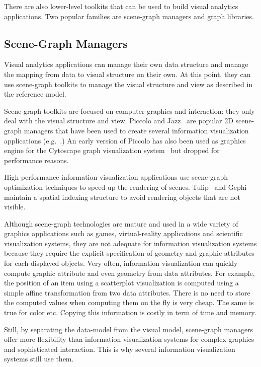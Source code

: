 There are also lower-level toolkits that can be used to build visual
analytics applications.  Two popular families are scene-graph managers
and graph libraries.

\subsection{Scene-Graph Managers}

Visual analytics applications can manage their own data structure and
manage the mapping from data to visual structure on their own.  At
this point, they can use scene-graph toolkits to manage the
visual structure and view as described in the reference model.

Scene-graph toolkits are focused on computer graphics and interaction:
they only deal with the visual structure and view.  Piccolo and
Jazz~\cite{Polylithic} are popular 2D scene-graph managers that have
been used to create several information visualization applications
(e.g.~\cite{SpaceTree,Geneaquilt}.) An early version of Piccolo has
also been used as graphics engine for the Cytoscape graph
visualization system~\cite{Cytoscape} but dropped for performance
reasons.

High-performance information visualization applications use
scene-graph optimization techniques to speed-up the rendering of
scenes.  Tulip~\cite{Tulip} and Gephi~\cite{Gephi} maintain a spatial
indexing structure to avoid rendering objects that are not visible.

Although scene-graph technologies are mature and used in a wide
variety of graphics applications such as games, virtual-reality
applications and scientific visualization systems, they are not
adequate for information visualization systems because they require
the explicit specification of geometry and graphic attributes for each
displayed objects.  Very often, information visualization can quickly
compute graphic attribute and even geometry from data attributes.  For
example, the position of an item using a scatterplot visualization is
computed using a simple affine transformation from two data
attributes.  There is no need to store the computed values when
computing them on the fly is very cheap.  The same is true for color
etc.  Copying this information is costly in term of time and memory.

Still, by separating the data-model from the visual model, scene-graph
managers offer more flexibility than information visualization systems
for complex graphics and sophisticated interaction.  This is why
several information visualization systems still use them.

